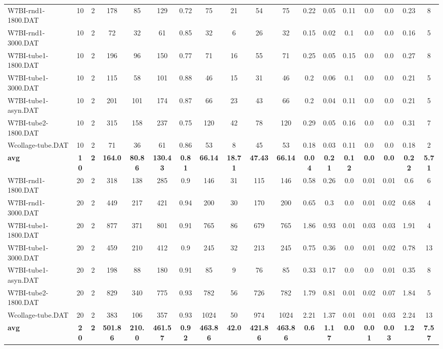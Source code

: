 \begin{sidewaystable}[h]
{\begin{tabular}{lccccccccccccccccc}
W7BI-rnd1-1800.DAT & 10 & 2 & 178 & 85 & 129 & 0.72 & 75 & 21 & 54 & 75 & 0.22 & 0.05 & 0.11 & 0.0 & 0.0 & 0.23 & 8\\
W7BI-rnd1-3000.DAT & 10 & 2 & 72 & 32 & 61 & 0.85 & 32 & 6 & 26 & 32 & 0.15 & 0.02 & 0.1 & 0.0 & 0.0 & 0.16 & 5\\
W7BI-tube1-1800.DAT & 10 & 2 & 196 & 96 & 150 & 0.77 & 71 & 16 & 55 & 71 & 0.25 & 0.05 & 0.15 & 0.0 & 0.0 & 0.27 & 8\\
W7BI-tube1-3000.DAT & 10 & 2 & 115 & 58 & 101 & 0.88 & 46 & 15 & 31 & 46 & 0.2 & 0.06 & 0.1 & 0.0 & 0.0 & 0.21 & 5\\
W7BI-tube1-asyn.DAT & 10 & 2 & 201 & 101 & 174 & 0.87 & 66 & 23 & 43 & 66 & 0.2 & 0.04 & 0.11 & 0.0 & 0.0 & 0.21 & 5\\
W7BI-tube2-1800.DAT & 10 & 2 & 315 & 158 & 237 & 0.75 & 120 & 42 & 78 & 120 & 0.29 & 0.05 & 0.16 & 0.0 & 0.0 & 0.31 & 7\\
Wcollage-tube.DAT & 10 & 2 & 71 & 36 & 61 & 0.86 & 53 & 8 & 45 & 53 & 0.18 & 0.03 & 0.11 & 0.0 & 0.0 & 0.18 & 2\\
\cline{1-18} \textbf{avg} & \textbf{10} & \textbf{2} & \textbf{164.0} & \textbf{80.86} & \textbf{130.43} & \textbf{0.81} & \textbf{66.14} & \textbf{18.71} & \textbf{47.43} & \textbf{66.14} & \textbf{0.04} & \textbf{0.21} & \textbf{0.12} & \textbf{0.0} & \textbf{0.0} & \textbf{0.22} & \textbf{5.71} \\ \cline{1-18}
W7BI-rnd1-1800.DAT & 20 & 2 & 318 & 138 & 285 & 0.9 & 146 & 31 & 115 & 146 & 0.58 & 0.26 & 0.0 & 0.01 & 0.01 & 0.6 & 6\\
W7BI-rnd1-3000.DAT & 20 & 2 & 449 & 217 & 421 & 0.94 & 200 & 30 & 170 & 200 & 0.65 & 0.3 & 0.0 & 0.01 & 0.02 & 0.68 & 4\\
W7BI-tube1-1800.DAT & 20 & 2 & 877 & 371 & 801 & 0.91 & 765 & 86 & 679 & 765 & 1.86 & 0.93 & 0.01 & 0.03 & 0.03 & 1.91 & 4\\
W7BI-tube1-3000.DAT & 20 & 2 & 459 & 210 & 412 & 0.9 & 245 & 32 & 213 & 245 & 0.75 & 0.36 & 0.0 & 0.01 & 0.02 & 0.78 & 13\\
W7BI-tube1-asyn.DAT & 20 & 2 & 198 & 88 & 180 & 0.91 & 85 & 9 & 76 & 85 & 0.33 & 0.17 & 0.0 & 0.0 & 0.01 & 0.35 & 8\\
W7BI-tube2-1800.DAT & 20 & 2 & 829 & 340 & 775 & 0.93 & 782 & 56 & 726 & 782 & 1.79 & 0.81 & 0.01 & 0.02 & 0.07 & 1.84 & 5\\
Wcollage-tube.DAT & 20 & 2 & 383 & 106 & 357 & 0.93 & 1024 & 50 & 974 & 1024 & 2.21 & 1.37 & 0.01 & 0.01 & 0.03 & 2.24 & 13\\
\cline{1-18} \textbf{avg} & \textbf{20} & \textbf{2} & \textbf{501.86} & \textbf{210.0} & \textbf{461.57} & \textbf{0.92} & \textbf{463.86} & \textbf{42.0} & \textbf{421.86} & \textbf{463.86} & \textbf{0.6} & \textbf{1.17} & \textbf{0.0} & \textbf{0.01} & \textbf{0.03} & \textbf{1.2} & \textbf{7.57} \\ \cline{1-18}

\end{tabular}}
\end{sidewaystable}
